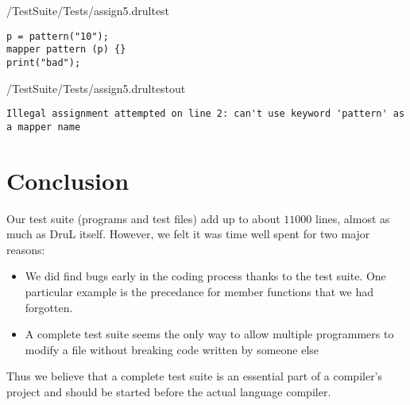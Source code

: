 /TestSuite/Tests/assign5.drultest
{\color{red}
\begin{verbatim}
p = pattern("10");
mapper pattern (p) {}
print("bad");
\end{verbatim}
}
/TestSuite/Tests/assign5.drultestout
{\color{blue}
\begin{verbatim}
Illegal assignment attempted on line 2: can't use keyword 'pattern' as a mapper name
\end{verbatim}
}



\section{Conclusion}
Our test suite (programs and test files) add up to about $11000$ lines, almost
as much as DruL itself. However, we felt it was time well spent for two major
reasons:
\begin{itemize}
\item We did find bugs early in the coding process thanks to the test suite. One
particular example is the precedance for member functions that we had forgotten.
\item A complete test suite seems the only way to allow multiple programmers to
modify a file without breaking code written by someone else
\end{itemize}
Thus we believe that a complete test suite is an essential part of a compiler's
project and should be started before the actual language compiler.


